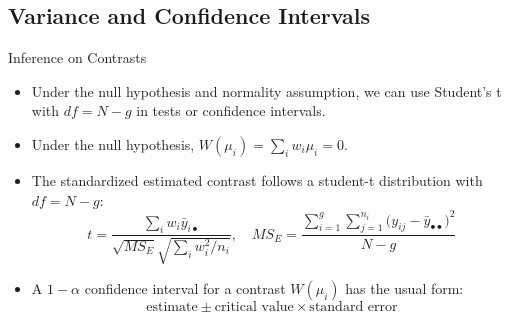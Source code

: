 
\subsection{Variance and Confidence Intervals}

\begin{frame}[allowframebreaks]{Inference on Contrasts}
  \begin{itemize}
    \item Under the null hypothesis and normality assumption, we can use Student's t with $df = N-g$ in tests or confidence intervals.
    \item Under the null hypothesis, $W(\mu_i) = \sum_i w_i \mu_i = 0$.
    \item The standardized estimated contrast follows a student-t distribution with $df = N-g$:
    $$
    t = \frac{\sum_i w_i \bar{y}_{i\bullet}}{\sqrt{MS_E} \sqrt{\sum_i w_i^2 / n_i}}, \quad MS_E = \frac{\sum_{i = 1}^g\sum_{j = 1}^{n_i} \big(y_{ij} - \bar{y}_{\bullet \bullet}\big)^2}{N-g}
    $$
    
    \framebreak

    \item A $1-\alpha$ confidence interval for a contrast $W(\mu_i)$ has the usual form:
    $$
    \text{estimate} \pm \text{critical value} \times \text{standard error}
    $$
  \end{itemize}
\end{frame}

